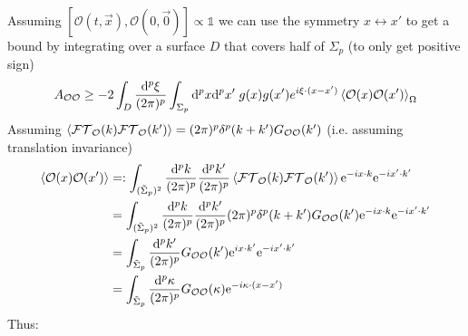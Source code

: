 \documentclass[a4paper,11pt]{article}
\numberwithin{equation}{section}
\theoremstyle{definition}
\renewcommand{\d}{{\mathrm{d}}}
\newcommand{\e}{{\mathrm{e}}}
\begin{document}
Assuming $[\mathcal{O}(t,\vec{x}),\mathcal{O}(0,\vec{0})]\propto \mathds{1}$ we can use the symmetry $x\leftrightarrow x'$ to get a bound by integrating over a surface $D$ that covers half of $\Sigma_p$ (to only get positive sign)
\begin{equation}\label{DifIne}
    A_{\mathcal{O}\mathcal{O}}\geq -2 \int_D \frac{\d^p\xi}{(2\pi)^p}\int_{\Sigma_p}\d^px\d^px'\;g(x)g(x')e^{i\xi\cdot(x-x')}\braket{\mathcal{O}(x)\mathcal{O}(x')}_\Omega
\end{equation}
Assuming $\braket{\mathcal{FT}_\mathcal{O}(k)\mathcal{FT}_\mathcal{O}(k')}=(2\pi)^p\delta^p(k+k')G_{\mathcal{O}\mathcal{O}}(k')$ (i.e. assuming translation invariance)
\begin{align}
    \braket{\mathcal{O}(x)\mathcal{O}(x')}&=: \int_{(\Tilde{\Sigma}_p)^2}\frac{\d^pk}{(2\pi)^p}\frac{\d^pk'}{(2\pi)^p}\braket{\mathcal{FT}_\mathcal{O}(k)\mathcal{FT}_\mathcal{O}(k')}\e^{-ix \cdot k}\e^{-ix' \cdot k'}\notag\\
    &= \int_{(\Tilde{\Sigma}_p)^2}\frac{\d^pk}{(2\pi)^p}\frac{\d^pk'}{(2\pi)^p}(2\pi)^p\delta^p(k+k')G_{\mathcal{O}\mathcal{O}}(k')\e^{-ix \cdot k}\e^{-ix' \cdot k'}\notag\\
    &= \int_{\Tilde{\Sigma}_p}\frac{\d^pk'}{(2\pi)^p}G_{\mathcal{O}\mathcal{O}}(k')\e^{ix \cdot k'}\e^{-ix' \cdot k'}\notag\\
    &= \int_{\Tilde{\Sigma}_p}\frac{\d^p\kappa}{(2\pi)^p}G_{\mathcal{O}\mathcal{O}}(\kappa)\e^{-i\kappa\cdot(x-x')}
\end{align}
Thus:
\end{document}
